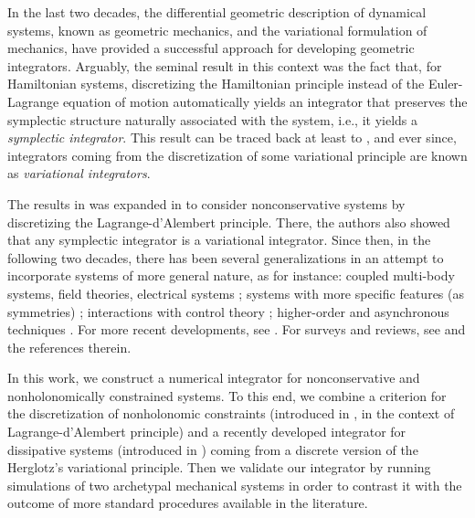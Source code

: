 \documentclass{aims}
\numberwithin{equation}{section}
\theoremstyle{definition}
\begin{document}
In the last two decades, the differential geometric description of dynamical systems, known as geometric mechanics, and the variational formulation of mechanics, have provided a successful approach for developing geometric integrators. 
Arguably, the seminal result in this context was the fact that, for Hamiltonian systems, discretizing the Hamiltonian principle instead of the Euler-Lagrange equation of motion automatically yields an integrator that preserves the symplectic structure naturally associated with the system, i.e., it yields a {\it symplectic integrator}. This result can be traced back at least to \cite{wendlandt1997mechanical}, and ever since, integrators coming from the discretization of some variational principle are known as {\it variational integrators}. 

The results in \cite{wendlandt1997mechanical} was expanded in \cite{marsden2001discrete} to consider nonconservative systems by discretizing the Lagrange-d'Alembert principle. There, the authors also showed that any symplectic integrator is a variational integrator. Since then, in the following two decades, there has been several generalizations in an attempt to incorporate systems of more general nature, as for instance: coupled multi-body systems, field theories, electrical systems \cite{ding2014higher, leyendecker2008variational, stern2015geometric,  ober2013variational, Galerkin-Variational-2017, MPSW2001Variational-Multisymplectic}; systems with more specific features (as symmetries) \cite{lee2007lie, shen2017lie, demoures2015discrete, marsden1997mechanical, LLM2007Lie-Variational}; interactions with control theory \cite{colombo2012variational, leok2007overview, campos2015high, hussein2006discrete, de2007discrete}; higher-order and asynchronous techniques \cite{LMOW2003AVI, HL2015Spectral-Variational, LS2012Gen-Technique}. For more recent developments, see \cite{Variational-Disipative-2020, variational-2019, Adaptive-Variational-2021, Variational-2020,tran2022multisymplectic, leok2019variational, colombo2022variational, colombo2018variational}. For surveys and reviews, see \cite{Lew2003anoverview, LMO2004Variational-Time-Integrators, Lew2016, maciel2020comparison} and the references therein.

In this work, we construct a numerical integrator for nonconservative and nonholonomically constrained systems. To this end, we combine a criterion for the discretization of nonholonomic constraints (introduced in \cite{cortes2001non}, in the context of Lagrange-d'Alembert principle) and a recently developed integrator for dissipative systems (introduced in \cite{vermeeren2019contact}) coming from a discrete version of the Herglotz's variational principle.  Then we validate our integrator by running simulations of two archetypal mechanical systems in order to contrast it with the outcome of more standard procedures available in the literature.
\end{document}
